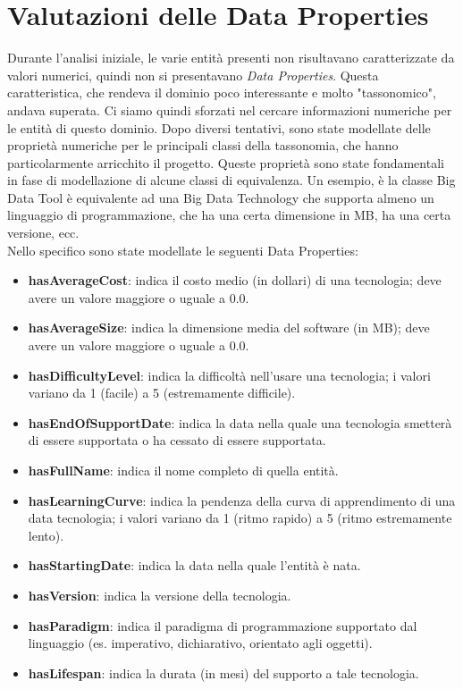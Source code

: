 \section{Valutazioni delle Data Properties}

Durante l'analisi iniziale, le varie entità presenti non risultavano caratterizzate da valori numerici, quindi non si presentavano \textit{Data Properties}. Questa caratteristica, che rendeva il dominio poco interessante e molto "tassonomico", andava superata. Ci siamo quindi sforzati nel cercare informazioni numeriche per le entità di questo dominio. Dopo diversi tentativi, sono state modellate delle proprietà numeriche per le principali classi della tassonomia, che hanno particolarmente arricchito il progetto. Queste proprietà sono state fondamentali in fase di modellazione di alcune classi di equivalenza. Un esempio, è la classe Big Data Tool è equivalente ad una Big Data Technology che supporta almeno un linguaggio di programmazione, che ha una certa dimensione in MB, ha una certa versione, ecc.\\

Nello specifico sono state modellate le seguenti Data Properties:
\begin{itemize}
    \item \textbf{hasAverageCost}: indica il costo medio (in dollari) di una tecnologia; deve avere un valore maggiore o uguale a 0.0.
    \item \textbf{hasAverageSize}: indica la dimensione media del software (in MB); deve avere un valore maggiore o uguale a 0.0.
    \item \textbf{hasDifficultyLevel}: indica la difficoltà nell'usare una tecnologia; i valori variano da 1 (facile) a 5 (estremamente difficile).
    \item \textbf{hasEndOfSupportDate}: indica la data nella quale una tecnologia smetterà di essere supportata o ha cessato di essere supportata.
    \item \textbf{hasFullName}: indica il nome completo di quella entità.
    \item \textbf{hasLearningCurve}: indica la pendenza della curva di apprendimento di una data tecnologia; i valori variano da 1 (ritmo rapido) a 5 (ritmo estremamente lento).
    \item \textbf{hasStartingDate}: indica la data nella quale l'entità è nata.
    \item \textbf{hasVersion}: indica la versione della tecnologia.
    \item \textbf{hasParadigm}: indica il paradigma di programmazione supportato dal linguaggio (es. imperativo, dichiarativo, orientato agli oggetti).
    \item \textbf{hasLifespan}: indica la durata (in mesi) del supporto a tale tecnologia.
\end{itemize}

